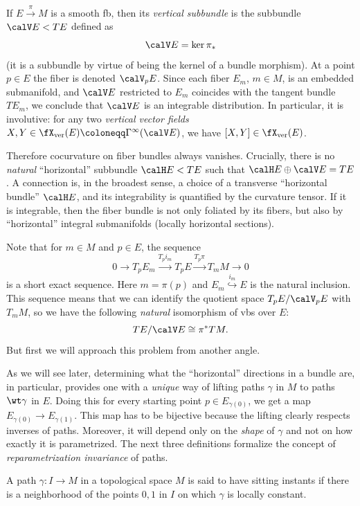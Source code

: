 \begin{defn}
    If $E\overset{\pi}{\to}M$ is a smooth \gls{fb}, then its \emph{vertical subbundle} is the subbundle $\calV E< TE$ defined as 
    \[\calV E=\ker \pi_\ast\]
    (it is a subbundle by virtue of being the kernel of a bundle morphism). At a point $p\in E$ the fiber is denoted $\calV_pE$. Since each fiber $E_m$, $m\in M$, is an embedded submanifold, and $\calV E$ restricted to $E_m$ coincides with the tangent bundle $TE_m$, we conclude that $\calV E$ is an integrable distribution. In particular, it is involutive: for any two \emph{vertical vector fields} $X,Y\in \fX_{\mathrm{ver}}(E)\coloneqq\Gamma^\infty(\calV E)$, we have $[X,Y]\in \fX_{\mathrm{ver}}(E)$.
\end{defn}

Therefore cocurvature on fiber bundles always vanishes. Crucially, there is no \emph{natural} ``horizontal'' subbundle $\calH E<TE$ such that $\calH E\oplus \calV E=TE$. A connection is, in the broadest sense, a choice of a transverse ``horizontal bundle'' $\calH E$, and its integrability is quantified by the curvature tensor. If it is integrable, then the fiber bundle is not only foliated by its fibers, but also by ``horizontal''  integral submanifolds (locally horizontal sections).

Note that for $m\in M$ and $p\in E$, the sequence
\[0\to T_p E_m\overset{T_p i_m}{\to}T_p E\overset{T_p\pi}{\to}T_mM\to 0\]
is a short exact sequence. Here $m=\pi(p)$ and $E_m\overset{i_m}{\hookrightarrow} E$ is the natural inclusion. This sequence means that we can identify the quotient space $T_pE\slash \calV_pE$ with $T_mM$, so we have the following \emph{natural} isomorphism of \glspl{vb} over $E$:
\[TE\slash \calV E\cong \pi^\ast TM.\]
But first we will approach this problem from another angle.

As we will see later, determining what the ``horizontal'' directions in a bundle are, in particular, provides one with a \emph{unique} way of lifting paths $\gamma$ in $M$ to paths $\wt\gamma$ in $E$. Doing this for every starting point $p\in E_{\gamma(0)}$, we get a map $E_{\gamma(0)}\to E_{\gamma(1)}$. This map has to be bijective because the lifting clearly respects inverses of paths. Moreover, it will depend only on the \emph{shape} of $\gamma$ and not on how exactly it is parametrized. The next three definitions formalize the concept of \emph{reparametrization invariance} of paths.

\begin{defn}
    A path $\gamma:I\to M$ in a topological space $M$ is said to have sitting instants if there is a neighborhood of the points $0,1$ in $I$ on which $\gamma$ is locally constant.
\end{defn}

